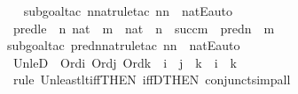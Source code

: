 \begin{isabellebody}
%
\isadelimproof
\ \ %
\endisadelimproof
%
\isatagproof
{}\isamarkupfalse%
{\isacharparenleft}{\kern0pt}subgoal{\isacharunderscore}{\kern0pt}tac\ {\isachardoublequoteopen}n{\isasymin}nat{\isachardoublequoteclose}{\isacharcomma}{\kern0pt}rule{\isacharunderscore}{\kern0pt}tac\ n{\isacharequal}{\kern0pt}{\isachardoublequoteopen}n{\isachardoublequoteclose}\ \ natE{\isacharcomma}{\kern0pt}auto{\isacharparenright}{\kern0pt}%
\endisatagproof
{\isafoldproof}%
%
\isadelimproof
\isanewline
%
\endisadelimproof
\isanewline
{}\isamarkupfalse%
\ pred{\isacharunderscore}{\kern0pt}le\ {\isacharcolon}{\kern0pt}\ {\isachardoublequoteopen}n{\isasymin}\ nat\ {\isasymLongrightarrow}\ m\ {\isasymin}\ nat\ {\isasymLongrightarrow}\ n\ {\isasymle}\ succ{\isacharparenleft}{\kern0pt}m{\isacharparenright}{\kern0pt}\ {\isasymLongrightarrow}\ pred{\isacharparenleft}{\kern0pt}n{\isacharparenright}{\kern0pt}\ {\isasymle}\ m{\isachardoublequoteclose}\isanewline
%
\isadelimproof
\ \ %
\endisadelimproof
%
\isatagproof
{}\isamarkupfalse%
{\isacharparenleft}{\kern0pt}subgoal{\isacharunderscore}{\kern0pt}tac\ {\isachardoublequoteopen}pred{\isacharparenleft}{\kern0pt}n{\isacharparenright}{\kern0pt}{\isasymin}nat{\isachardoublequoteclose}{\isacharcomma}{\kern0pt}rule{\isacharunderscore}{\kern0pt}tac\ n{\isacharequal}{\kern0pt}{\isachardoublequoteopen}n{\isachardoublequoteclose}\ \ natE{\isacharcomma}{\kern0pt}auto{\isacharparenright}{\kern0pt}%
\endisatagproof
{\isafoldproof}%
%
\isadelimproof
\isanewline
%
\endisadelimproof
\isanewline
{}\isamarkupfalse%
\ Un{\isacharunderscore}{\kern0pt}leD{}\ {\isacharcolon}{\kern0pt}\ {\isachardoublequoteopen}Ord{\isacharparenleft}{\kern0pt}i{\isacharparenright}{\kern0pt}{\isasymLongrightarrow}\ Ord{\isacharparenleft}{\kern0pt}j{\isacharparenright}{\kern0pt}{\isasymLongrightarrow}\ Ord{\isacharparenleft}{\kern0pt}k{\isacharparenright}{\kern0pt}{\isasymLongrightarrow}\ \ i\ {\isasymunion}\ j\ {\isasymle}\ k\ {\isasymLongrightarrow}\ i\ {\isasymle}\ k{\isachardoublequoteclose}\ \ \ \isanewline
%
\isadelimproof
\ \ %
\endisadelimproof
%
\isatagproof
{}\isamarkupfalse%
\ {\isacharparenleft}{\kern0pt}rule\ Un{\isacharunderscore}{\kern0pt}least{\isacharunderscore}{\kern0pt}lt{\isacharunderscore}{\kern0pt}iff{\isacharbrackleft}{\kern0pt}THEN\ iffD{}{\isacharbrackleft}{\kern0pt}THEN\ conjunct{}{\isacharbrackright}{\kern0pt}{\isacharbrackright}{\kern0pt}{\isacharcomma}{\kern0pt}simp{\isacharunderscore}{\kern0pt}all{\isacharparenright}{\kern0pt}%

\end{isabellebody}
